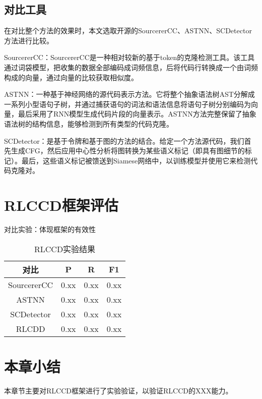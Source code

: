 \subsection{对比工具}
在对比整个方法的效果时，本文选取开源的SourcererCC、ASTNN、SCDetector方法进行比较。

SourcererCC：SourcererCC是一种相对较新的基于token的克隆检测工具。该工具通过词袋模型，把收集的数据全部编码成词频信息，后将代码行转换成一个由词频构成的向量，通过向量的比较获取相似度。

ASTNN：一种基于神经网络的源代码表示方法。它将整个抽象语法树AST分解成一系列小型语句子树，并通过捕获语句的词法和语法信息将语句子树分别编码为向量，最后采用了RNN模型生成代码片段的向量表示。ASTNN方法完整保留了抽象语法树的结构信息，能够检测到所有类型的代码克隆。

SCDetector：是基于令牌和基于图的方法的结合。给定一个方法源代码，我们首先生成CFG，然后应用中心性分析将图转换为某些语义标记（即具有图细节的标记）。最后，这些语义标记被馈送到Siamese网络中，以训练模型并使用它来检测代码克隆对。

\section{RLCCD框架评估 }

对比实验：体现框架的有效性


\begin{table}
  \centering
  \caption{RLCCD实验结果} %
  \begin{tabular*}{0.9\textwidth}{@{\extracolsep{\fill}}cccc}
  \toprule
    对比			&P		&R		&F1 \\
  \midrule
    SourcererCC			&0.xx	&0.xx		&0.xx \\
    ASTNN			&0.xx		&0.xx		&0.xx \\
    SCDetector			&0.xx	&0.xx		&0.xx \\
    RLCDD			&0.xx		&0.xx		&0.xx \\
  \bottomrule
  \end{tabular*}
\end{table}

\section{本章小结}
本章节主要对RLCCD框架进行了实验验证，以验证RLCCD的XXX能力。



